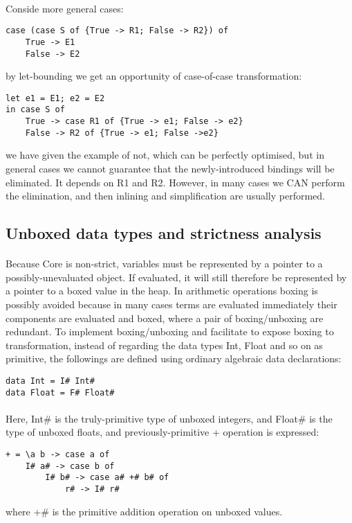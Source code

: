 \documentclass{article}
\begin{document}
	\paragraph{}
	Conside more general cases:
	\begin{lstlisting}
case (case S of {True -> R1; False -> R2}) of
	True -> E1
	False -> E2
	\end{lstlisting}
	by let-bounding we get an opportunity of case-of-case transformation:
	\begin{lstlisting}
let e1 = E1; e2 = E2
in case S of
	True -> case R1 of {True -> e1; False -> e2}
	False -> R2 of {True -> e1; False ->e2}
	\end{lstlisting}
	we have given the example of not, which can be perfectly optimised, but in general cases we cannot guarantee that the newly-introduced bindings will be eliminated. It depends on R1 and R2. However, in many cases we CAN perform the elimination, and then inlining and simplification are usually performed.
	\subsection{Unboxed data types and strictness analysis}
	\paragraph{}
	Because Core is non-strict, variables must be represented by a pointer to a possibly-unevaluated object. If evaluated, it will still therefore be represented by a pointer to a boxed value in the heap. In arithmetic operations boxing is possibly avoided because in many cases terms are evaluated immediately their components are evaluated and boxed, where a pair of boxing/unboxing are redundant. To implement boxing/unboxing and facilitate to expose boxing to transformation, instead of regarding the data types Int, Float and so on as primitive, the followings are defined using ordinary algebraic data declarations:
	\begin{lstlisting}
data Int = I# Int#
data Float = F# Float#
	\end{lstlisting}
	\paragraph{}
	Here, Int\# is the truly-primitive type of unboxed integers, and Float\# is the type of unboxed floats, and previously-primitive + operation is expressed:
	\begin{lstlisting}
+ = \a b -> case a of
	I# a# -> case b of
		I# b# -> case a# +# b# of
			r# -> I# r#
	\end{lstlisting}
	where +\# is the primitive addition operation on unboxed values.
\end{document}
